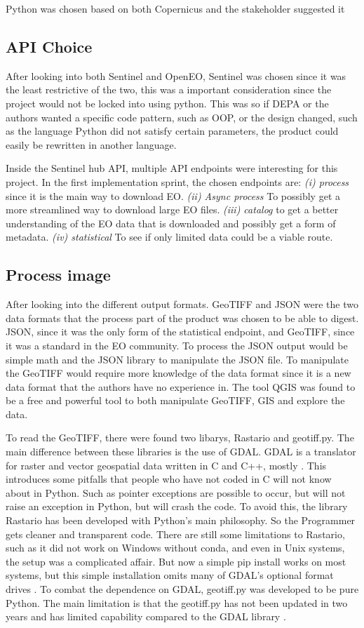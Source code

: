 Python was chosen based on both Copernicus and the stakeholder suggested it

\subsection{API Choice}
After looking into both Sentinel and OpenEO, Sentinel was chosen since it was the least restrictive of the two, this was a important consideration since the project would not be locked into using python. 
This was so if DEPA or the authors wanted a specific code pattern, such as \acrfull{OOP}, or the design changed, such as the language Python did not satisfy certain parameters, the product could easily be rewritten in another language. 

Inside the Sentinel hub API, multiple API endpoints were interesting for this project. In the first implementation sprint, the chosen endpoints are: \textit{(i) process} since it is the main way to download EO. \textit{(ii) Async process} To possibly get a more streamlined way to download large EO files. \textit{(iii) catalog} to get a better understanding of the EO data that is downloaded and possibly get a form of metadata. \textit{(iv) statistical} To see if only limited data could be a viable route.


\subsection{Process image}
After looking into the different output formats. GeoTIFF and JSON were the two data formats that the process part of the product was chosen to be able to digest. 
JSON, since it was the only form of the statistical endpoint, and GeoTIFF, since it was a standard in the EO community.
To process the JSON output would be simple math and the JSON library to manipulate the JSON file. To manipulate the GeoTIFF would require more knowledge of the data format since it is a new data format that the authors have no experience in. The tool QGIS was found to be a free and powerful tool to both manipulate GeoTIFF, GIS and explore the data. 

To read the GeoTIFF, there were found two libarys, Rastario and geotiff.py. The main difference between these libraries is the use of GDAL. GDAL is a translator for raster and vector geospatial data written in C and C++, mostly \cite{rouault_2025_15375292}.
This introduces some pitfalls that people who have not coded in C will not know about in Python. Such as pointer exceptions are possible to occur, but will not raise an exception in Python, but will crash the code.
To avoid this, the library Rastario has been developed with Python's main philosophy. So the Programmer gets cleaner and transparent code. There are still some limitations to Rastario, such as it did not work on Windows without conda, and even in Unix systems, the setup was a complicated affair. But now a simple pip install works on most systems, but this simple installation omits many of GDAL's optional format drives \cite{rastario}. 
To combat the dependence on GDAL, geotiff.py was developed to be pure Python. The main limitation is that the geotiff.py has not been updated in two years and has limited capability compared to the GDAL library \cite{geotiff.py}. 


